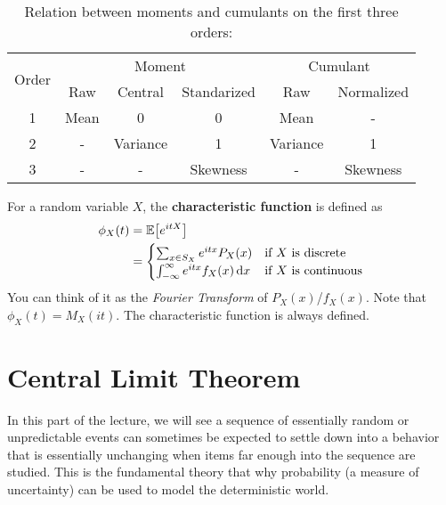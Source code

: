 \begin{table}[H]
    \centering
    \begin{tabular}{|c|ccc|cc|}
    \hline
    \multirow{2}{*}{Order} & \multicolumn{3}{c|}{Moment}                                          & \multicolumn{2}{c|}{Cumulant}            \\ \cline{2-6}
     & \multicolumn{1}{c|}{Raw} & \multicolumn{1}{c|}{Central} & Standarized & \multicolumn{1}{c|}{Raw} & Normalized \\ \hline
    1                      & \multicolumn{1}{c|}{Mean} & \multicolumn{1}{c|}{0}        & 0        & \multicolumn{1}{c|}{Mean}     & -        \\ \hline
    2                      & \multicolumn{1}{c|}{-}    & \multicolumn{1}{c|}{Variance} & 1        & \multicolumn{1}{c|}{Variance} & 1        \\ \hline
    3                      & \multicolumn{1}{c|}{-}    & \multicolumn{1}{c|}{-}        & Skewness & \multicolumn{1}{c|}{-}        & Skewness \\ \hline
    \end{tabular}
    \caption{Relation between moments and cumulants on the first three orders:}
    \label{tab:my-table}
\end{table}

\begin{definition}
    For a random variable $X$, the \textbf{characteristic function} is defined as
    \begin{align*}
        \phi_X(t)&=\E{e^{itX}}\\
        &=\begin{cases}
            \sum_{x\in S_X}e^{itx}P_X(x) & \text{if $X$ is discrete}\\
            \int_{-\infty}^{\infty}e^{itx}f_X(x)\diff x & \text{if $X$ is continuous}
        \end{cases}
    \end{align*}
    You can think of it as the \textit{Fourier Transform} of $P_X(x)$/$f_X(x)$. Note that $\phi_X(t)=M_X(it)$. The characteristic function is always defined.
\end{definition}

\section{Central Limit Theorem}
In this part of the lecture, we will see a sequence of essentially random or unpredictable events can sometimes be expected to settle down into a behavior that is essentially unchanging when items far enough into the sequence are studied. This is the fundamental theory that why probability (\ie a measure of uncertainty) can be used to model the deterministic world.

